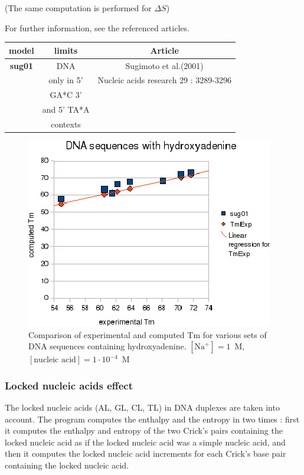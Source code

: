 \documentclass{article}
\begin{document}
       (The same computation is performed for $\Delta S$) 
       
For further information, see the referenced articles.

\begin{table}[hc]
\begin{tabular}[h]{| c | c | c |}
\textbf{model} & \textbf{limits} & \textbf{Article} \\
\hline
\textbf{sug01} & DNA & Sugimoto et al.(2001)\\
 & only in 5' & Nucleic acids research 29 : 3289-3296\\
 & GA*C 3' & \\
 & and 5' TA*A & \\
 & contexts & \\
 \hline
\end{tabular}
\end{table}

\begin{figure}[h]
\includegraphics[width=1\linewidth]{images/Hydroxyadenine}
\caption{Comparison of experimental and computed Tm for various sets of
 DNA sequences containing hydroxyadenine. $[\mbox{Na}^+] = 1$~M, $[\mbox{nucleic acid}] = 1\cdot{}10^{-4}$~M}
\end{figure}

\subsubsection{Locked nucleic acids effect}

The locked nucleic acids (AL, GL, CL, TL) in DNA duplexes are taken into account.
The program computes the enthalpy and the entropy in two times : first it computes the enthalpy and entropy of 
the two Crick's pairs containing the locked nucleic acid as if the locked nucleic acid was a simple nucleic acid,
and then it computes the locked nucleic acid increments for each Crick's base pair containing the locked nucleic acid.
\end{document}
